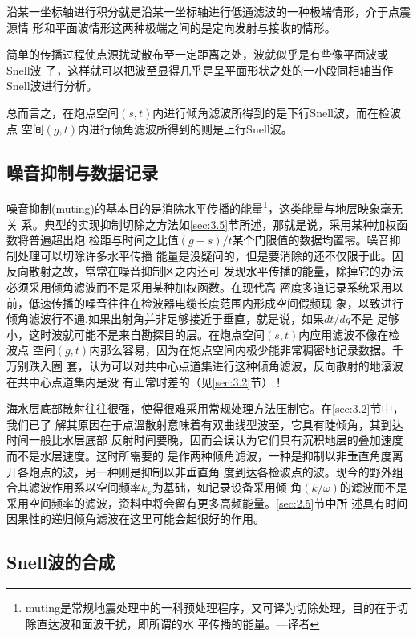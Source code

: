 沿某一坐标轴进行积分就是沿某一坐标轴进行低通滤波的一种极端情形，介于点震源情
形和平面波情形这两种极端之间的是定向发射与接收的情形。

简单的传播过程使点源扰动散布至一定距离之处，波就似乎是有些像平面波或Snell波
了，这样就可以把波至显得几乎是呈平面形状之处的一小段同相轴当作Snell波进行分析。

总而言之，在炮点空间$(s,t)$内进行倾角滤波所得到的是下行Snell波，而在检波点
空间$(g,t)$内进行倾角滤波所得到的则是上行Snell波。


\subsection{噪音抑制与数据记录}
\label{sec:5.3.2}

噪音抑制(muting)的基本目的是消除水平传播的能量\footnote{
muting是常规地震处理中的一科预处理程序，又可译为切除处理，目的在于切除直达波和面波干扰，即所谓的水
平传播的能量。---译者
}，这类能量与地层映象毫无关
系。典型的实现抑制切除之方法如\ref{sec:3.5}节所述，那就是说，采用某种加权函数将普遍超出炮
检距与时间之比值$(g-s)/t$某个门限值的数据均置零。噪音抑制处理可以切除许多水平传播
能量是没疑问的，但是要消除的还不仅限于此。因反向散射之故，常常在噪音抑制区之内还可
发现水平传播的能量，除掉它的办法必须采用倾角滤波而不是采用某种加权函数。在现代高
密度多道记录系统采用以前，低速传播的噪音往往在检波器电缆长度范围内形成空间假频现
象，以致进行倾角滤波行不通.如果出射角并非足够接近于垂直，就是说，如果$dt/dg$不是
足够小，这时波就可能不是来自勘探目的层。在炮点空间$(s,t)$内应用滤波不像在检波点
空间$(g,t)$内那么容易，因为在炮点空间内极少能非常稠密地记录数据。千万别跌入圈
套，认为可以对共中心点道集进行这种倾角滤波，反向散射的地滚波在共中心点道集内是没
有正常时差的（见\ref{sec:3.2}节）！

海水层底部散射往往很强，使得很难采用常规处理方法压制它。在\ref{sec:3.2}节中，我们已了
解其原因在于点溫散射意味着有双曲线型波至，它具有陡倾角，其到达时间一般比水层底部
反射时间要晚，因而会误认为它们具有沉积地层的叠加速度而不是水层速度。这时所需要的
是作两种倾角滤波，一种是抑制以非垂直角度离开各炮点的波，另一种则是抑制以非垂直角
度到达各检波点的波。现今的野外组合其滤波作用系以空间频率$k_x$为基础，如记录设备采用倾
角$(k/\omega)$的滤波而不是采用空间频率的滤波，资料中将会留有更多高频能量。\ref{sec:2.5}节中所
述具有时间因果性的递归倾角滤波在这里可能会起很好的作用。


\subsection{Snell波的合成}
\label{sec:5.3.3}

